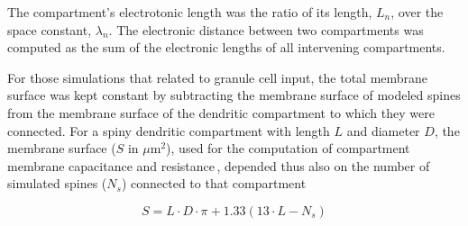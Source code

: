 \documentclass[12pt]{article}
\begin{document}
\begin{enumerate}
The compartment's electrotonic length was the ratio of its length, 
$L_n$, over the space constant, $\lambda_n$. The electronic distance
between two compartments was computed as the sum of the electronic
lengths of all intervening compartments.

For those simulations that
related to granule cell input, the total membrane surface was kept
constant by subtracting the membrane surface of modeled spines
from the membrane surface of the
dendritic compartment to which they were connected.
For a spiny dendritic compartment with length $L$ and diameter $D$, the
membrane surface ($S$ in $\mu$m$^2$), used for the computation of compartment
membrane capacitance and resistance\,\cite{R:1989cr, Rapp-M:1992kx},
depended thus also on the number
of simulated spines ($N_s$) connected to that compartment

\begin{equation}
   S = L\cdot D\cdot \pi + 1.33(13\cdot L - N_s)
\end{equation}

\end{enumerate}



\end{document}
